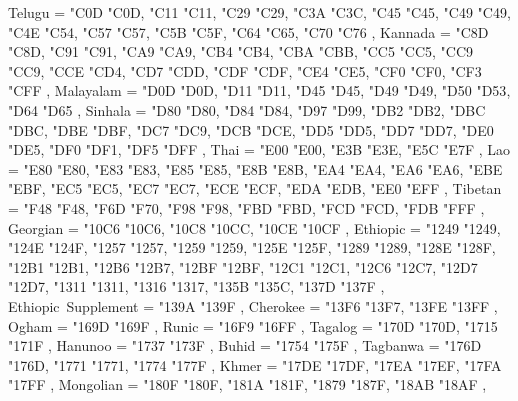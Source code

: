 {    Telugu                                         = { {"C0D} {"C0D}, {"C11} {"C11}, {"C29} {"C29}, {"C3A} {"C3C}, {"C45} {"C45}, {"C49} {"C49}, {"C4E} {"C54}, {"C57} {"C57}, {"C5B} {"C5F}, {"C64} {"C65}, {"C70} {"C76} },
    Kannada                                        = { {"C8D} {"C8D}, {"C91} {"C91}, {"CA9} {"CA9}, {"CB4} {"CB4}, {"CBA} {"CBB}, {"CC5} {"CC5}, {"CC9} {"CC9}, {"CCE} {"CD4}, {"CD7} {"CDD}, {"CDF} {"CDF}, {"CE4} {"CE5}, {"CF0} {"CF0}, {"CF3} {"CFF} },
    Malayalam                                      = { {"D0D} {"D0D}, {"D11} {"D11}, {"D45} {"D45}, {"D49} {"D49}, {"D50} {"D53}, {"D64} {"D65} },
    Sinhala                                        = { {"D80} {"D80}, {"D84} {"D84}, {"D97} {"D99}, {"DB2} {"DB2}, {"DBC} {"DBC}, {"DBE} {"DBF}, {"DC7} {"DC9}, {"DCB} {"DCE}, {"DD5} {"DD5}, {"DD7} {"DD7}, {"DE0} {"DE5}, {"DF0} {"DF1}, {"DF5} {"DFF} },
    Thai                                           = { {"E00} {"E00}, {"E3B} {"E3E}, {"E5C} {"E7F} },
    Lao                                            = { {"E80} {"E80}, {"E83} {"E83}, {"E85} {"E85}, {"E8B} {"E8B}, {"EA4} {"EA4}, {"EA6} {"EA6}, {"EBE} {"EBF}, {"EC5} {"EC5}, {"EC7} {"EC7}, {"ECE} {"ECF}, {"EDA} {"EDB}, {"EE0} {"EFF} },
    Tibetan                                        = { {"F48} {"F48}, {"F6D} {"F70}, {"F98} {"F98}, {"FBD} {"FBD}, {"FCD} {"FCD}, {"FDB} {"FFF} },
    Georgian                                       = { {"10C6} {"10C6}, {"10C8} {"10CC}, {"10CE} {"10CF} },
    Ethiopic                                       = { {"1249} {"1249}, {"124E} {"124F}, {"1257} {"1257}, {"1259} {"1259}, {"125E} {"125F}, {"1289} {"1289}, {"128E} {"128F}, {"12B1} {"12B1}, {"12B6} {"12B7}, {"12BF} {"12BF}, {"12C1} {"12C1}, {"12C6} {"12C7}, {"12D7} {"12D7}, {"1311} {"1311}, {"1316} {"1317}, {"135B} {"135C}, {"137D} {"137F} },
    Ethiopic~Supplement                            = { {"139A} {"139F} },
    Cherokee                                       = { {"13F6} {"13F7}, {"13FE} {"13FF} },
    Ogham                                          = { {"169D} {"169F} },
    Runic                                          = { {"16F9} {"16FF} },
    Tagalog                                        = { {"170D} {"170D}, {"1715} {"171F} },
    Hanunoo                                        = { {"1737} {"173F} },
    Buhid                                          = { {"1754} {"175F} },
    Tagbanwa                                       = { {"176D} {"176D}, {"1771} {"1771}, {"1774} {"177F} },
    Khmer                                          = { {"17DE} {"17DF}, {"17EA} {"17EF}, {"17FA} {"17FF} },
    Mongolian                                      = { {"180F} {"180F}, {"181A} {"181F}, {"1879} {"187F}, {"18AB} {"18AF} },
}
